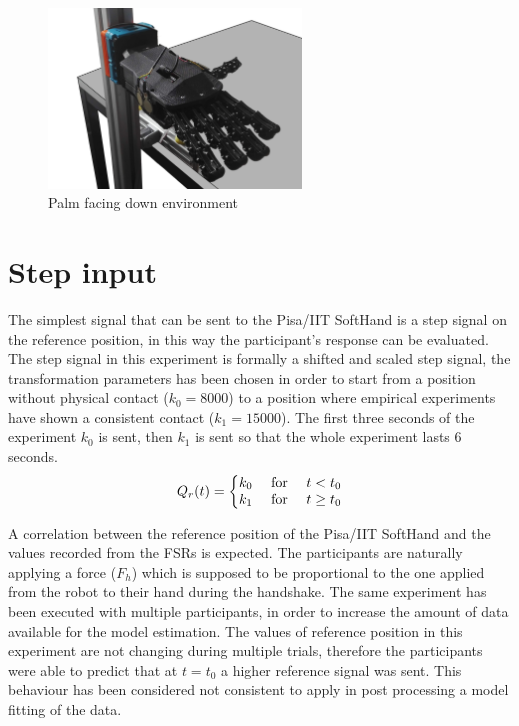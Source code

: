 \begin{figure}[ht]
\centering
\includegraphics[width=0.6\textwidth]{Figure/stand.png}
\caption{Palm facing down environment}
\label{Fig:palmdown}
\end{figure}
\newpage
\section{Step input}
The simplest signal that can be sent to the Pisa/IIT SoftHand is a step signal on the reference position, in this way the participant's response can be evaluated. The step signal in this experiment is formally a shifted and scaled step signal, the transformation parameters has been chosen in order to start from a position without physical contact ($k_0 = 8000 $) to a position where empirical experiments have shown a consistent contact ($k_1 = 15000$). The first three seconds of the experiment $k_0$ is sent, then $k_1$ is sent so that the whole experiment lasts 6 seconds.\\
\begin{equation}
Q_{r}(t)=\left\{\begin{matrix}
k_{0} & $ for $ & t < t_0 \\ 
k_{1} & $ for $ & t \geq t_0
\end{matrix}\right.
\label{EQ:StepSignal}
\end{equation}

A correlation between the reference position of the Pisa/IIT SoftHand and the values recorded from the FSRs is expected. The participants are naturally applying a force ($F_{h}$) which is supposed to be proportional to the one applied from the robot to their hand during the handshake.
The same experiment has been executed with multiple participants, in order to increase the amount of data available for the model estimation. The values of reference position in this experiment are not changing during multiple trials, therefore the participants were able to predict that at $t=t_0$ a higher reference signal was sent. This behaviour has been considered not consistent to apply in post processing a model fitting of the data. 

